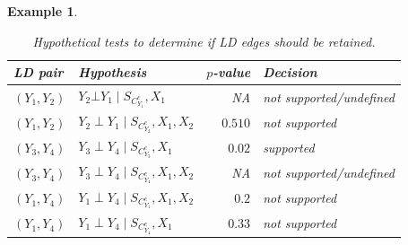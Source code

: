 \documentclass[12pt]{article}
\newcommand{\coauthortodo}[1]{%
  \marginnote{%
    \begin{tcolorbox}[
      width=\marginparwidth,
      colback=yellow!15!white, colframe=orange!70!black,
      colbacktitle=yellow!35!white, coltitle=black,
      title=TODO, fonttitle=\bfseries\scriptsize,
      toptitle=2pt, bottomtitle=2pt,
      fontupper=\scriptsize, boxrule=0.4pt, arc=1mm,
      boxsep=0pt, left=2pt, right=2pt, top=3pt, bottom=3pt,
      before skip=0pt, after skip=0pt
    ]
      \raggedright #1
    \end{tcolorbox}%
  }%
}
\theoremstyle{examplestyle}
\newtheorem{example}{Example}[section]
\begin{document}
\begin{mybox3}
\begin{example}
\begin{table}[H]
\centering
\begin{tabular}{l l r l}
\hline
LD pair & Hypothesis & $p$-value & Decision \\
\hline
$(Y_1,Y_2)$ & $Y_2 \bot Y_1 \mid S_{C_{Y_1}^c},X_1$ & NA & not supported/undefined \\
$(Y_1,Y_2)$ & $Y_2 \perp Y_1 \mid S_{C_{Y_2}^c},X_1,X_2$ & $0.510$ & not supported\\
$(Y_3,Y_4)$ & $Y_3 \perp Y_4 \mid S_{C_{Y_3}^c},X_1$ & $0.02$ & supported \\
$(Y_3,Y_4)$ & $Y_3 \perp Y_4 \mid S_{C_{Y_4}^c},X_1,X_2$ & NA & not supported/undefined \\
$(Y_1,Y_4)$ & $Y_1 \perp Y_4 \mid S_{C_{Y_1}^c},X_1,X_2$ & $0.2$ & not supported \\
$(Y_1,Y_4)$ & $Y_1 \perp Y_4 \mid S_{C_{Y_4}^c},X_1$ & $0.33$ & not supported \\
\hline  
\end{tabular}
\caption{Hypothetical tests to determine if LD edges should be retained.}
\label{tab:step6_ld_example}
\end{table}


\begin{center}
\end{center}
\end{example}
\end{mybox3}
\end{document}
